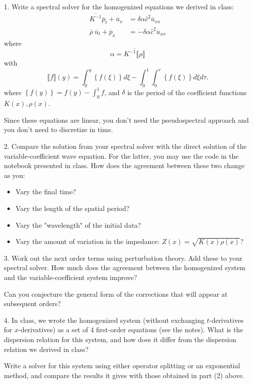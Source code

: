 \documentclass{article}
\newcommand{\fluctint}[1]{\llbracket #1 \rrbracket}
\begin{document}
1.  Write a spectral solver for the homogenized equations we derived in class:
\begin{align}
    \overline{K^{-1}} \overline{p}_t + \overline{u}_x & = \delta \alpha \hat{c}^2 \overline{u}_{xx} \\
    \overline{\rho} \  \overline{u}_t + \overline{p}_x & = -\delta \alpha \hat{c}^2 \overline{u}_{xx}
\end{align}
where
$$
    \alpha = \overline{K^{-1}\fluctint{\rho}}
$$
with
$$
    \fluctint{f}(y) = \int_0^y\left\{f(\xi)\right\}d\xi  - \int_0^1 \int_0^\tau \left\{f(\xi)\right\}d\xi d\tau.
$$
where $\left\{f(y)\right\} = f(y) - \int_0^1 f$,
and $\delta$ is the period of the coefficient functions $K(x), \rho(x)$.

Since these equations are linear, you don't need the pseudospectral approach and you don't need to
discretize in time.
\vspace{0.3in}

2.  Compare the solution from your spectral solver with the direct solution of the variable-coefficient wave
equation.  For the latter, you may use the code in the notebook presented in class.  How does the agreement between
these two change as you:
\begin{itemize}
    \item Vary the final time?
    \item Vary the length of the spatial period?
    \item Vary the "wavelength" of the initial data?
    \item Vary the amount of variation in the impedance: $Z(x) = \sqrt{K(x) \rho(x)}$?
\end{itemize}

\vspace{0.3in}
\vspace{0.3in}

3.  Work out the next order terms using perturbation theory.  Add these to your spectral solver.  How much does the agreement between
the homogenized system and the variable-coefficient system improve?

Can you conjecture the general form of the corrections that will appear at subsequent orders?
\vspace{0.3in}

4.  In class, we wrote the homogenized system (without exchanging $t$-derivatives for $x$-derivatives) 
as a set of 4 first-order equations (see the notes).  What is the dispersion relation for this system, and how does it differ
from the dispersion relation we derived in class?

Write a solver for this system using either operator splitting or an exponential method, and compare the results
it gives with those obtained in part (2) above.
\end{document}
